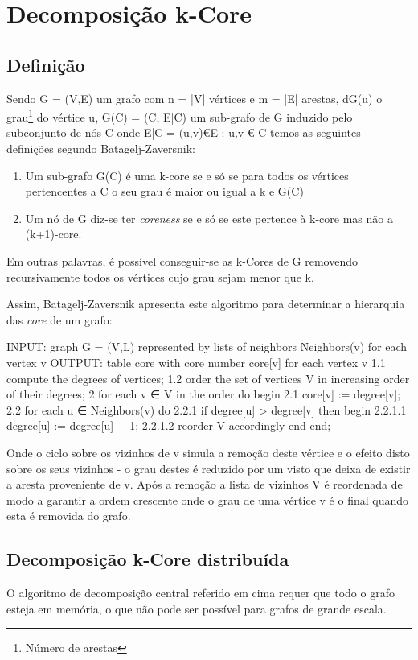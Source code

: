 \documentclass[a4paper,10pt]{report}
\begin{document}
\section*{Decomposição k-Core}


\subsection*{Definição}
Sendo G = (V,E) um grafo com n = |V| vértices e m = |E| arestas, dG(u) o grau\footnote{Número de arestas} do vértice u, G(C) = (C, E|C) um sub-grafo de G induzido pelo subconjunto de nós C onde E|C = {(u,v)€E : u,v € C} temos as seguintes definições segundo Batagelj-Zaversnik:

\begin{enumerate}
	\item Um sub-grafo G(C) é uma k-core se e só se para todos os vértices pertencentes a C o seu grau é maior ou igual a k e G(C)
	\item Um nó de G diz-se ter \textit{coreness} se e só se este pertence à k-core mas não a (k+1)-core.
\end{enumerate}


Em outras palavras, é possível conseguir-se as k-Cores de G removendo recursivamente todos os vértices cujo grau sejam menor que k.

Assim, Batagelj-Zaversnik apresenta este algoritmo para determinar a hierarquia das \textit{core} de um grafo:

INPUT: graph G = (V,L) represented by lists of neighbors Neighbors(v) for
each vertex v
OUTPUT: table core with core number core[v] for each vertex v
1.1 compute the degrees of vertices;
1.2 order the set of vertices V in increasing order of their degrees;
2 for each v ∈ V in the order do begin
2.1 core[v] := degree[v];
2.2 for each u ∈ Neighbors(v) do
2.2.1 if degree[u] > degree[v] then begin
2.2.1.1 degree[u] := degree[u] − 1;
2.2.1.2 reorder V accordingly
end
end;

Onde o ciclo sobre os vizinhos de v simula a remoção deste vértice e o efeito disto sobre os seus vizinhos - o grau destes é reduzido por um visto que deixa de existir a aresta proveniente de v.
Após a remoção a lista de vizinhos V é reordenada de modo a garantir a ordem crescente onde o grau de uma vértice v é o final quando esta é removida do grafo.


\subsection*{Decomposição k-Core distribuída}
O algoritmo de decomposição central referido em cima requer que todo o grafo esteja em memória, o que não pode ser possível para grafos de grande escala.



\end{document}
